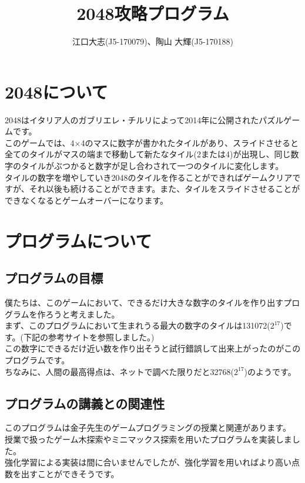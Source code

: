 \documentclass[11pt,a4paper]{jsarticle}
\title{2048攻略プログラム}
\author{江口大志(J5-170079)、陶山 大輝(J5-170188)}
\begin{document}
\maketitle
%

\section{2048について}
\noindent
2048はイタリア人のガブリエレ・チルリによって2014年に公開されたパズルゲームです。\\
このゲームでは、4×4のマスに数字が書かれたタイルがあり、スライドさせると全てのタイルがマスの端まで移動して新たなタイル(2または4)が出現し、同じ数字のタイルがぶつかると数字が足し合わされて一つのタイルに変化します。\\
タイルの数字を増やしていき2048のタイルを作ることができればゲームクリアですが、それ以後も続けることができます。また、タイルをスライドさせることができなくなるとゲームオーバーになります。\\


\section{プログラムについて}
\subsection{プログラムの目標}
\noindent
僕たちは、このゲームにおいて、できるだけ大きな数字のタイルを作り出すプログラムを作ろうと考えました。\\
まず、このプログラムにおいて生まれうる最大の数字のタイルは131072($2^{17}$)です。(下記の参考サイトを参照しました。)\\
この数字にできるだけ近い数を作り出そうと試行錯誤して出来上がったのがこのプログラムです。\\
ちなみに、人間の最高得点は、ネットで調べた限りだと32768($2^{17}$)のようです。\\

\newpage
\subsection{プログラムの講義との関連性}
\noindent
このプログラムは金子先生のゲームプログラミングの授業と関連があります。\\
授業で扱ったゲーム木探索やミニマックス探索を用いたプログラムを実装しました。\\
強化学習による実装は間に合いませんでしたが、強化学習を用いればより高い点数を出すことができそうです。\\
\end{document}
